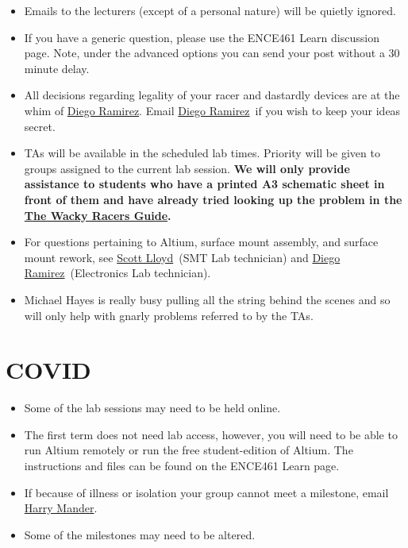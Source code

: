 \documentclass[11pt, a4paper]{article}
\makeatletter
\newcommand{\harry}{\href{mailto:harry.mander@pg.canterbury.ac.nz}{Harry Mander}}
\newcommand{\scott}{\href{mailto:scott.lloyd@.canterbury.ac.nz}{Scott Lloyd}}
\newcommand{\diego}{\href{mailto:diego.ramirez@canterbury.ac.nz}{Diego Ramirez}}
\newcommand{\theguide}{\href{https://eng-git.canterbury.ac.nz/wacky-racers/wacky-racers/-/blob/master/doc/guide/guide.pdf}{The Wacky Racers Guide}}
\makeatother
\begin{document}
\begin{itemize}
\item Emails to the lecturers (except of a personal nature) will be
  quietly ignored.

\item If you have a generic question, please use the ENCE461 Learn
  discussion page.  Note, under the advanced options you can send your
  post without a 30\,minute delay.

\item All decisions regarding legality of your racer and dastardly
  devices are at the whim of \diego.  Email \diego\ if you wish to
  keep your ideas secret.

\item TAs will be available in the scheduled lab times.  Priority will
  be given to groups assigned to the current lab session. \textbf{We
    will only provide assistance to students who have a printed A3
    schematic sheet in front of them and have already tried looking up
    the problem in the \theguide.}

\item For questions pertaining to Altium, surface mount assembly, and
  surface mount rework, see \scott\ (SMT Lab technician) and
  \diego\ (Electronics Lab technician).

\item Michael Hayes is really busy pulling all the string behind the
  scenes and so will only help with gnarly problems referred to by the
  TAs.

\end{itemize}


\section{COVID}


\begin{itemize}
\item Some of the lab sessions may need to be held online.

\item The first term does not need lab access, however, you will need
  to be able to run Altium remotely or run the free student-edition of
  Altium.  The instructions and files can be found on the ENCE461
  Learn page.

\item If because of illness or isolation your group cannot meet a
  milestone, email \harry.

\item Some of the milestones may need to be altered.

\end{itemize}
\end{document}
